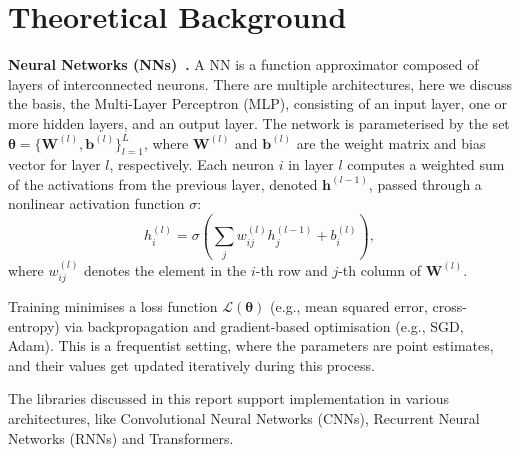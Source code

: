 \documentclass[conference]{IEEEtran}
\newcommand{\btheta}{\bm{\theta}}
\begin{document}
\section{Theoretical Background}
\label{sec:theory}

\textbf{Neural Networks (NNs)~\citep{goan2020bayesian}.} A NN is a function approximator
composed of layers of interconnected neurons. There are multiple architectures, here we
discuss the basis, the Multi-Layer Perceptron (MLP), consisting of an input layer, one or
more hidden layers, and an output layer. The network is parameterised by the set $\btheta =
\{\mathbf{W}^{(l)}, \mathbf{b}^{(l)}\}_{l=1}^{L}$, where $\mathbf{W}^{(l)}$ and
$\mathbf{b}^{(l)}$ are the weight matrix and bias vector for layer $l$, respectively. Each
neuron $i$ in layer $l$ computes a weighted sum of the activations from the previous layer,
denoted $\mathbf{h}^{(l-1)}$, passed through a nonlinear activation function
$\sigma$:\begin{equation}h_i^{(l)} = \sigma\left(\sum_j w_{ij}^{(l)} h_j^{(l-1)} +
b_i^{(l)}\right),\end{equation}where $w_{ij}^{(l)}$ denotes the element in the $i$-th row
and $j$-th column of $\mathbf{W}^{(l)}$.

Training minimises a loss function $\mathcal{L}(\btheta)$ (e.g., mean squared error,
cross-entropy) via backpropagation and gradient-based optimisation (e.g., SGD, Adam). This
is a frequentist setting, where the parameters are point estimates, and their values get
updated iteratively during this process.

The libraries discussed in this report support implementation in various architectures, like
Convolutional Neural Networks (CNNs), Recurrent Neural Networks (RNNs) and Transformers.
\end{document}
